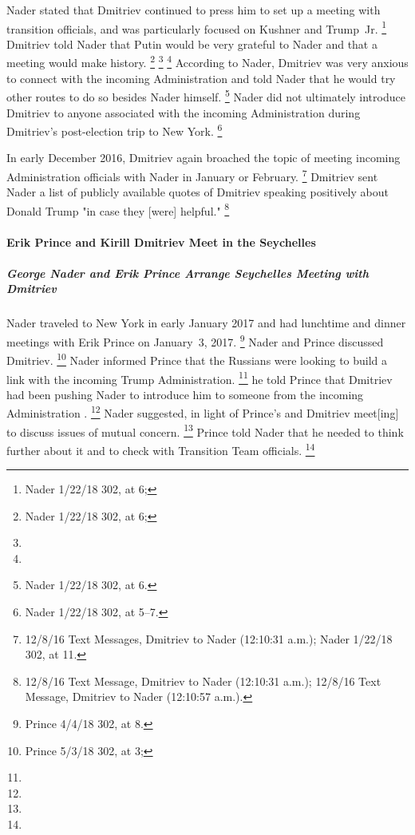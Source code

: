 Nader stated that Dmitriev continued to press him to set up a meeting with transition officials, and was particularly focused on Kushner and Trump~Jr.%
\footnote{Nader 1/22/18 302, at 6;
}
Dmitriev told Nader that Putin would be very grateful to Nader and that a meeting would make history.%
\footnote{Nader 1/22/18 302, at 6;
}
\footnote{}
\footnote{}
According to Nader, Dmitriev was very anxious to connect with the incoming Administration and told Nader that he would try other routes to do so besides Nader himself.%
\footnote{Nader 1/22/18 302, at 6.}
Nader did not ultimately introduce Dmitriev to anyone associated with the incoming Administration during Dmitriev's post-election trip to New York.%
\footnote{Nader 1/22/18 302, at 5--7.}

In early December 2016, Dmitriev again broached the topic of meeting incoming Administration officials with Nader in January or February.%
\footnote{12/8/16 Text Messages, Dmitriev to Nader (12:10:31 a.m.);
Nader 1/22/18 302, at 11.}
Dmitriev sent Nader a list of publicly available quotes of Dmitriev speaking positively about Donald Trump "in case they [were] helpful."%
\footnote{12/8/16 Text Message, Dmitriev to Nader (12:10:31 a.m.);
12/8/16 Text Message, Dmitriev to Nader (12:10:57 a.m.).}

\paragraph{Erik Prince and Kirill Dmitriev Meet in the Seychelles}

\subparagraph{George Nader and Erik Prince Arrange Seychelles Meeting with Dmitriev}

Nader traveled to New York in early January 2017 and had lunchtime and dinner meetings with Erik Prince on January~3, 2017.%
\footnote{Prince 4/4/18 302, at 8.}
Nader and Prince discussed Dmitriev.%
\footnote{Prince 5/3/18 302, at 3; }
Nader informed Prince that the Russians were looking to build a link with the incoming Trump Administration.%
\footnote{}
he told Prince that Dmitriev had been pushing Nader to introduce him to someone from the incoming Administration
.%
\footnote{}
Nader suggested, in light of Prince's and Dmitriev meet[ing] to discuss issues of mutual concern.%
\footnote{}
Prince told Nader that he needed to think further about it and to check with Transition Team officials.%
\footnote{}

